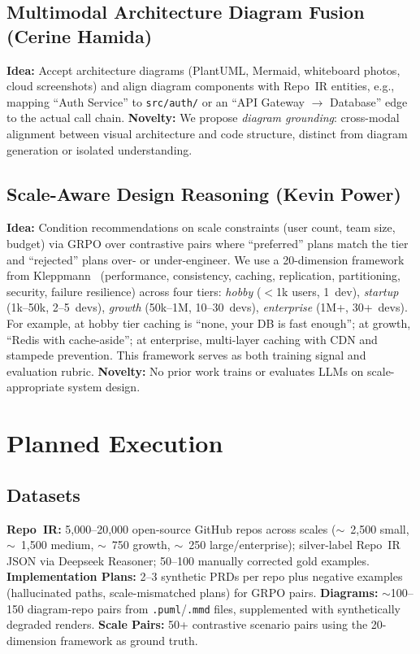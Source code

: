 \documentclass{article}
\begin{document}
\subsection{Multimodal Architecture Diagram Fusion \textnormal{(Cerine Hamida)}}
\textbf{Idea:} Accept architecture diagrams (PlantUML, Mermaid, whiteboard photos, cloud screenshots) and align diagram components with Repo~IR entities, e.g., mapping ``Auth Service'' to \texttt{src/auth/} or an ``API Gateway $\to$ Database'' edge to the actual call chain.
\textbf{Novelty:} We propose \emph{diagram grounding}: cross-modal alignment between visual architecture and code structure, distinct from diagram generation or isolated understanding.

\subsection{Scale-Aware Design Reasoning \textnormal{(Kevin Power)}}
\textbf{Idea:} Condition recommendations on scale constraints (user count, team size, budget) via GRPO over contrastive pairs where ``preferred'' plans match the tier and ``rejected'' plans over- or under-engineer. We use a 20-dimension framework from Kleppmann~\cite{kleppmann} (performance, consistency, caching, replication, partitioning, security, failure resilience) across four tiers: \emph{hobby} ($<$1k users, 1~dev), \emph{startup} (1k--50k, 2--5~devs), \emph{growth} (50k--1M, 10--30~devs), \emph{enterprise} (1M+, 30+~devs). For example, at hobby tier caching is ``none, your DB is fast enough''; at growth, ``Redis with cache-aside''; at enterprise, multi-layer caching with CDN and stampede prevention. This framework serves as both training signal and evaluation rubric.
\textbf{Novelty:} No prior work trains or evaluates LLMs on scale-appropriate system design.

\section{Planned Execution}

\subsection{Datasets}
\textbf{Repo~IR:} 5,000--20,000 open-source GitHub repos across scales ($\sim$~2,500 small, $\sim$~1,500 medium, $\sim$~750 growth, $\sim$~250 large/enterprise); silver-label Repo~IR JSON via Deepseek Reasoner; 50--100 manually corrected gold examples.
\textbf{Implementation Plans:} 2--3 synthetic PRDs per repo plus negative examples (hallucinated paths, scale-mismatched plans) for GRPO pairs.
\textbf{Diagrams:} $\sim$100--150 diagram-repo pairs from \texttt{.puml}/\texttt{.mmd} files, supplemented with synthetically degraded renders.
\textbf{Scale Pairs:} 50+ contrastive scenario pairs using the 20-dimension framework as ground truth.
\end{document}
